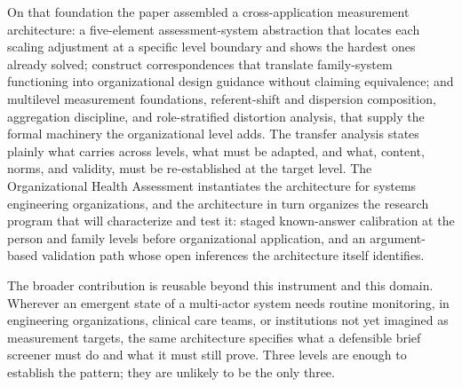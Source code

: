 \documentclass[12pt, letterpaper]{article}
\begin{document}
On that foundation the paper assembled a cross-application measurement architecture: a five-element assessment-system abstraction that locates each scaling adjustment at a specific level boundary and shows the hardest ones already solved; construct correspondences that translate family-system functioning into organizational design guidance without claiming equivalence; and multilevel measurement foundations, referent-shift and dispersion composition, aggregation discipline, and role-stratified distortion analysis, that supply the formal machinery the organizational level adds. The transfer analysis states plainly what carries across levels, what must be adapted, and what, content, norms, and validity, must be re-established at the target level. The Organizational Health Assessment instantiates the architecture for systems engineering organizations, and the architecture in turn organizes the research program that will characterize and test it: staged known-answer calibration at the person and family levels before organizational application, and an argument-based validation path whose open inferences the architecture itself identifies.

The broader contribution is reusable beyond this instrument and this domain. Wherever an emergent state of a multi-actor system needs routine monitoring, in engineering organizations, clinical care teams, or institutions not yet imagined as measurement targets, the same architecture specifies what a defensible brief screener must do and what it must still prove. Three levels are enough to establish the pattern; they are unlikely to be the only three.

\printbibliography
\end{document}
